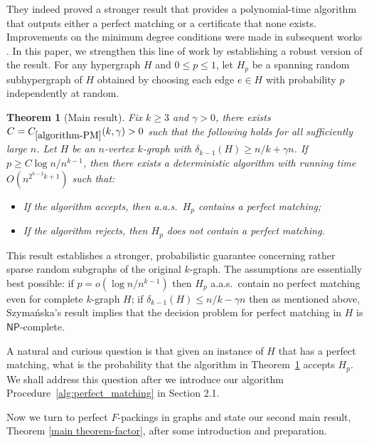 \documentclass[11pt, letterpaper]{amsart}
\theoremstyle{plain}
\numberwithin{equation}{section}
\newtheorem{theorem}[thm]{Theorem}
\theoremstyle{definition}
\begin{document}
    They indeed proved a stronger result that provides a polynomial-time algorithm that outputs either a perfect matching or a certificate that none exists.
    Improvements on the minimum degree conditions were made in subsequent works \cite{han2017decision, han2020complexity}.
    In this paper, we strengthen this line of work by establishing a robust version of the result. 
    For any hypergraph \(H\) and \(0\le p\le 1\), let \(H_p\) be a spanning random subhypergraph of \(H\) obtained by choosing each edge \(e\in H\) with probability \(p\) independently at random.



    \begin{theorem}
    [Main result]
    \label{algorithm-PM}
       Fix \(k\ge 3\) and \(\gamma>0\), there exists $ C=C_{\ref{algorithm-PM}}(k,\gamma)>0 $ such that the following holds for all sufficiently large \( n \). Let $H$ be an $n$-vertex $k$-graph with $\delta_{k-1}(H)\ge n/k+\gamma n$. If \(p\ge C\log n/n^{k-1}\), then there exists a deterministic algorithm with running time $O(n^{2^{k-2}k+1})$ such that:
        \begin{itemize}
        \item If the algorithm accepts, then a.a.s.~$H_p$ contains a perfect matching;
        \item If the algorithm rejects, then $H_p$ does not contain a perfect matching.
        \end{itemize}
    \end{theorem}


    This result establishes a stronger, probabilistic guarantee concerning rather sparse random subgraphs of the original $k$-graph.
    The assumptions are essentially best possible: if $p=o(\log n/n^{k-1})$ then $H_p$ a.a.s.~contain no perfect matching even for complete $k$-graph $H$; if $\delta_{k-1}(H) \le n/k - \gamma n$ then as mentioned above, Szyma\'nska's result implies that the decision problem for perfect matching in $H$ is $\mathsf{NP}$-complete.

A natural and curious question is that given an instance of $H$ that has a perfect matching, what is the probability that the algorithm in Theorem~\ref{algorithm-PM} accepts $H_p$.
We shall address this question after we introduce our algorithm Procedure~\ref{alg:perfect_matching} in Section 2.1.

 Now we turn to perfect $F$-packings in graphs and state our second main result, Theorem \ref{main theorem-factor}, after some introduction and preparation.
\end{document}
